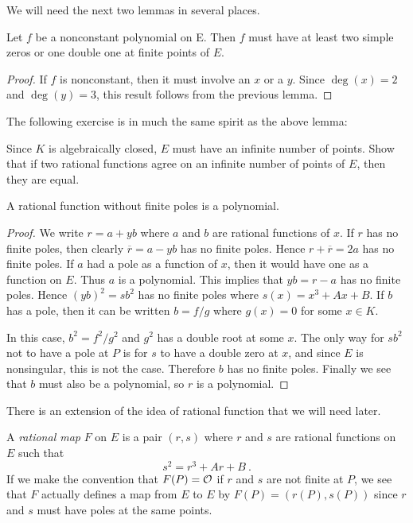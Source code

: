 We will need the next two lemmas in several places.

\begin{lem}
\label{l4.8}
Let $f$ be a nonconstant polynomial on E. Then $f$ must have at least two simple zeros or one double one at finite points of $E$.
\end{lem}

\begin{proof}
If $f$ is nonconstant, then it must involve an $x$ or a $y$. Since $\deg(x)=2$ and $\deg(y)=3$, this result follows from the previous lemma.
\end{proof}

The following exercise is in much the same spirit as the above lemma:

\begin{exo}
\label{e4.9}
Since $K$ is algebraically closed, $E$ must have an infinite number of points. Show that if two rational functions agree on an infinite number of points of $E$, then they are equal.
\end{exo}

\begin{lem}
\label{l4.10}
A rational function without finite poles is a polynomial.
\end{lem}

\begin{proof}
We write $r=a+yb$ where $a$ and $b$ are rational functions of $x$. If $r$ has no finite poles, then clearly $\overline{r}=a - yb$ has no finite poles. Hence $r+\overline{r}=2a$ has no finite poles. If $a$ had a pole as a function of $x$, then it would have one as a function on $E$. Thus $a$ is a polynomial. This implies that $yb=r-a$ has no finite poles. Hence $(yb)^{2}=sb^{2}$ has no finite poles where $s(x)=x^{3}+Ax+B$. If $b$ has a pole, then it can be written $b=f/g$ where $g(x)=0$ for some $x\in K$.

In this case, $b^{2}=f^{2}/g^{2}$ and $g^{2}$ has a double root at some $x$. The only way for $sb^{2}$ not to have a pole at $P$ is for $s$ to have a double zero at $x$, and since $E$ is nonsingular, this is not the case. Therefore $b$ has no finite poles. Finally we see that $b$ must also be a polynomial, so $r$ is a polynomial.
\end{proof}

There is an extension of the idea of rational function that we will need later.

\begin{defi}
\label{d4.11}
A {\it rational map} $F$ on $E$ is a pair $(r,s)$ where $r$ and $s$ are rational functions on $E$ such that
$$
s^{2}=r^{3}+Ar+B\ .
$$
If we make the convention that $F(P)=\mathcal{O}$ if $r$ and $s$ are not finite at $P$, we see that $F$ actually defines a map from $E$ to $E$ by $F(P)=(r(P),s(P))$ since $r$ and $s$ must have poles at the same points.
\end{defi}

